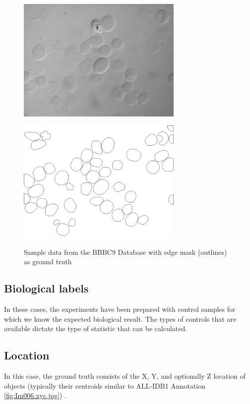\begin{figure}[H]
\begin{minipage}[c]{0.4\linewidth}
\centering
\includegraphics[width=80mm]{../images/48hr-001-DIC.jpg}
\label{fig:BBBC009_img}
\end{minipage}
\hfill
\begin{minipage}[c]{0.4\linewidth}
\centering
\includegraphics[width=80mm]{../images/48hr-001-DIC_.jpg}
\label{fig:BBBC009_O}
\end{minipage}
\caption{Sample data from the BBBC9 Database with edge mask (outlines) as ground truth}
\end{figure}

\subsection{Biological labels}
In these cases, the experiments have been prepared with control samples for which we know the expected biological result. The types of controls that are available dictate the type of statistic that can be calculated.

\subsection{Location}
In this case, the ground truth consists of the X, Y, and optionally Z location of objects (typically their centroids similar to ALL-IDB1 Annotation \ref{fig:Im006.xyc.jpg}) .

